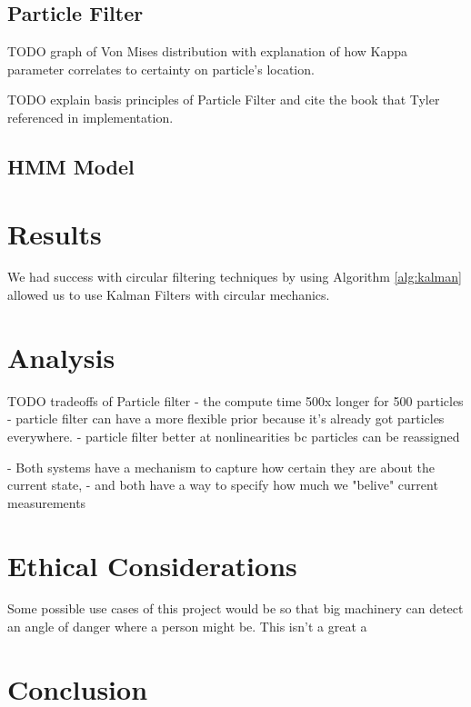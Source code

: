 \documentclass[11pt]{amsart}
\begin{document}
\subsection{Particle Filter}

TODO graph of Von Mises distribution with explanation of how Kappa parameter 
correlates to certainty on particle's location.

TODO explain basis principles of Particle Filter and cite the book
that Tyler referenced in implementation.

\subsection{HMM Model}

\section{Results}

We had success with circular filtering techniques by using Algorithm \ref{alg:kalman} allowed us to use Kalman Filters with circular mechanics.


\section{Analysis}

TODO tradeoffs of Particle filter - the compute time 500x longer for 500 particles
- particle filter can have a more flexible prior because it's already got particles everywhere.
- particle filter better at nonlinearities bc particles can be reassigned

- Both systems have a mechanism to capture how certain they are about the current state,
- and both have a way to specify how much we "belive" current measurements

\section{Ethical Considerations}
Some possible use cases of this project would be so that big machinery can detect an angle of danger where a person might be. 
This isn't a great a 

\section{Conclusion}
\end{document}

